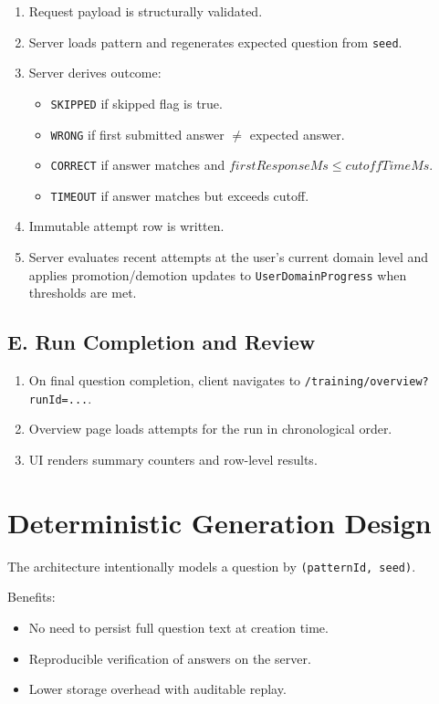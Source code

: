 \documentclass[11pt]{article}
\begin{document}
\begin{enumerate}[leftmargin=*]
	\item Request payload is structurally validated.
	\item Server loads pattern and regenerates expected question from \texttt{seed}.
	\item Server derives outcome:
	\begin{itemize}
		\item \texttt{SKIPPED} if skipped flag is true.
		\item \texttt{WRONG} if first submitted answer \(\neq\) expected answer.
		\item \texttt{CORRECT} if answer matches and \(firstResponseMs \le cutoffTimeMs\).
		\item \texttt{TIMEOUT} if answer matches but exceeds cutoff.
	\end{itemize}
	\item Immutable attempt row is written.
	\item Server evaluates recent attempts at the user's current domain level and applies promotion/demotion updates to \texttt{UserDomainProgress} when thresholds are met.
\end{enumerate}

\subsection*{E. Run Completion and Review}

\begin{enumerate}[leftmargin=*]
	\item On final question completion, client navigates to \texttt{/training/overview?runId=...}.
	\item Overview page loads attempts for the run in chronological order.
	\item UI renders summary counters and row-level results.
\end{enumerate}

\section{Deterministic Generation Design}

The architecture intentionally models a question by \texttt{(patternId, seed)}.

Benefits:

\begin{itemize}[leftmargin=*]
	\item No need to persist full question text at creation time.
	\item Reproducible verification of answers on the server.
	\item Lower storage overhead with auditable replay.
\end{itemize}
\end{document}
